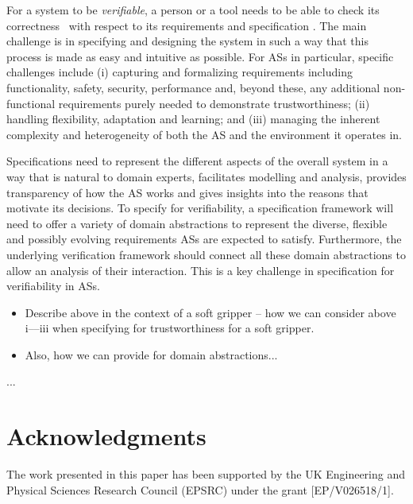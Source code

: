 \documentclass[lettersize,journal]{IEEEtran}
\begin{document}
For a system to be {\em verifiable\/}, a person or a tool needs to be able to check its correctness~\cite{ISO24765:2017} with respect to its requirements and specification \cite{Abeywickrama2022}. 
The main challenge is in specifying and designing the system in such a way that this process is made as easy and intuitive as possible.
%
For ASs in particular, specific challenges include 
%
(i) capturing and formalizing requirements including functionality, safety, security, performance and, beyond these, any additional non-functional requirements purely needed to demonstrate trustworthiness; 
%	 
(ii) handling flexibility, adaptation and learning; and 
%
(iii) managing the inherent complexity and heterogeneity of both the AS and the environment it operates in. 

Specifications need to represent the different aspects of the overall system in a way that is natural to domain experts, facilitates modelling and analysis, provides transparency of how the AS works and gives insights into the reasons that motivate its decisions. 
%
To specify for verifiability, a specification framework will need to offer a variety of domain abstractions to represent the diverse, flexible and possibly evolving requirements ASs are expected to satisfy. 
%
Furthermore, the underlying verification framework should connect all these domain abstractions to allow an analysis of their interaction. This is a key challenge in specification for verifiability in ASs.

\begin{itemize}
	\item Describe above in the context of a soft gripper – how we can consider above i––iii when specifying for trustworthiness for a soft gripper.
	\item Also, how we can provide for domain abstractions...
\end{itemize}
...\\
\cite{Cheng2021,Bhattacharya2019,Bianchi2018,Cai2021,Chen2018,Hong2022,Farrell2022,Hwang2020,Liu2021,Loh2014,Mohan2020,Negrello2020,Nishikawa2019,Pozzi2016,Shin2021,Sotiropoulos2018,Tadakuma2020,Triantafyllou2019}


\section*{Acknowledgments}
The work presented in this paper has been supported by the UK Engineering and Physical Sciences Research Council (EPSRC) under the grant [EP/V026518/1].




\newpage

\vfill
\end{document}
